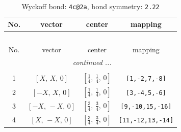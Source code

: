 \documentclass[fleqn,8pt]{jsarticle}
\begin{document}
\renewcommand{\arraystretch}{1.2}
\begin{longtable}{cccc}
\caption{Wyckoff bond: {\tt 4c@2a}, bond symmetry: {\tt 2.22}}
 \\
 \hline \hline
No. & vector & center & mapping \\ \hline \endfirsthead

\multicolumn{3}{l}{\tablename\ \thetable{}} \\
 \hline \hline
No. & vector & center & mapping \\ \hline \endhead

 \hline \hline
\multicolumn{3}{r}{\footnotesize\it continued ...} \\ \endfoot

 \hline \hline
\multicolumn{3}{r}{} \\ \endlastfoot

1 & $\left[ X,\, X,\, 0 \right]$ & $\left[ \frac{1}{4},\, \frac{1}{4},\, 0 \right]$ & {\tt [1,-2,7,-8]} \\ \hline
2 & $\left[ - X,\, X,\, 0 \right]$ & $\left[ \frac{1}{4},\, \frac{1}{4},\, 0 \right]$ & {\tt [3,-4,5,-6]} \\ \hline
3 & $\left[ - X,\, - X,\, 0 \right]$ & $\left[ \frac{3}{4},\, \frac{3}{4},\, 0 \right]$ & {\tt [9,-10,15,-16]} \\ \hline
4 & $\left[ X,\, - X,\, 0 \right]$ & $\left[ \frac{3}{4},\, \frac{3}{4},\, 0 \right]$ & {\tt [11,-12,13,-14]} \\
\end{longtable}
\renewcommand{\arraystretch}{1.2}
\end{document}
